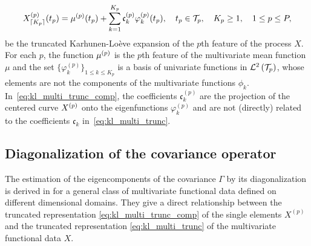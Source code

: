 \begin{equation}\label{eq:kl_multi_trunc_comp}
    X_{\lceil K_p \rceil}^{(p)}(t_p) = \mu^{(p)}(t_p) + \sum_{k = 1}^{K_p} \mathfrak{c}^{(p)}_k \varphi_k^{(p)}(t_p), \quad t_p \in \mathcal{T}_{p}, \quad K_p \geq 1, \quad 1 \leq p \leq P,
\end{equation}
be the truncated Karhunen-Loève expansion of the $p$th feature of the process $X$. For each $p$, the function $\mu^{(p)}$ is the $p$th feature of the multivariate mean function $\mu$ and the set $\{\varphi^{(p)}_k\}_{1 \leq k \leq K_p}$ is a basis of univariate functions in $\mathcal{L}^{2}\left(\mathcal{T}_{p}\right)$, whose elements are not the components of the multivariate functions $\phi_k$. In~\eqref{eq:kl_multi_trunc_comp}, the coefficients $\mathfrak{c}^{(p)}_k$ are the projection of the centered curve $X^{(p)}$ onto the eigenfunctions $\varphi_k^{(p)}$ and are not (directly) related to the coefficients $\mathfrak{c}_k$ in~\eqref{eq:kl_multi_trunc}.


\subsection{Diagonalization of the covariance operator} %
\label{sub:by_diagonalization_of_the_covariance_operator}

The estimation of the eigencomponents of the covariance $\Gamma$ by its diagonalization is derived in \cite{happMultivariateFunctionalPrincipal2018a} for a general class of multivariate functional data defined on different dimensional domains. They give a direct relationship between the truncated representation \eqref{eq:kl_multi_trunc_comp} of the single elements $X^{(p)}$ and the truncated representation \eqref{eq:kl_multi_trunc} of the multivariate functional data $X$.

